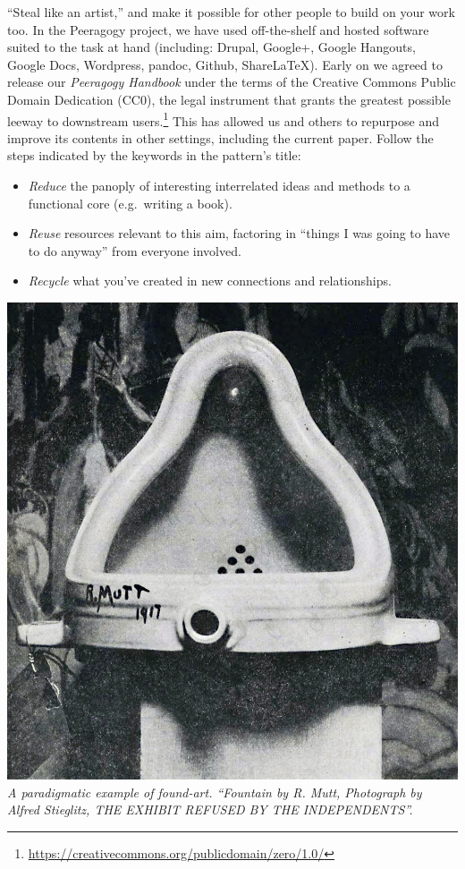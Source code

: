 ``Steal like an artist,'' and make it possible for other people to build
on your work too. In the Peeragogy project, we have used off-the-shelf
and hosted software suited to the task at hand (including: Drupal,
Google+, Google Hangouts, Google Docs, Wordpress, pandoc, Github,
ShareLaTeX). Early on we agreed to release our \emph{Peeragogy Handbook}
under the terms of the Creative Commons Public Domain Dedication (CC0),
the legal instrument that grants the greatest possible leeway to
downstream users.\footnote{\url{https://creativecommons.org/publicdomain/zero/1.0/}}
This has allowed us and others to repurpose and improve its contents in
other settings, including the current paper. Follow the steps indicated
by the keywords in the pattern's title:

\begin{itemize}
\tightlist
\item
  \emph{Reduce} the panoply of interesting interrelated ideas and
  methods to a functional core (e.g.~writing a book).
\item
  \emph{Reuse} resources relevant to this aim, factoring in ``things I
  was going to have to do anyway'' from everyone involved.
\item
  \emph{Recycle} what you've created in new connections and
  relationships.
\end{itemize}

\includegraphics{images/Duchamp_Fountaine.jpg}\\
\emph{A paradigmatic example of found-art. ``Fountain by R. Mutt,
Photograph by Alfred Stieglitz, THE EXHIBIT REFUSED BY THE
INDEPENDENTS''.}

